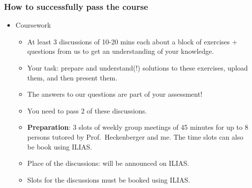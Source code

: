 \documentclass[aspectratio=169, 12pt, final, professionalfont]{beamer}
\begin{document}
\begin{frame}\frametitle{How to successfully pass the course}
  \begin{itemize}
    \item Coursework
    \begin{itemize}
      \item At least 3 discussions of 10-20 mins each about a block of exercises + questions from us to get an understanding of your knowledge.
      \pause
      \item Your task: prepare and understand(!) solutions to these exercises, upload them, and then present them.
      \item The answers to our questions are part of your assessment!
      \item You need to pass 2 of these discussions.\\[0.25\baselineskip]
      \item \textbf{Preparation}: 3 slots of weekly group meetings of 45 minutes for up to 8 persons tutored by Prof.\ Heckenberger and me.
      The time slots can also be book using ILIAS.\\[0.25\baselineskip]
      \item Place of the discussions: will be announced on ILIAS.
      \item Slots for the discussions must be booked using ILIAS.
    \end{itemize}
  \end{itemize}
  \end{frame}
\end{document}
